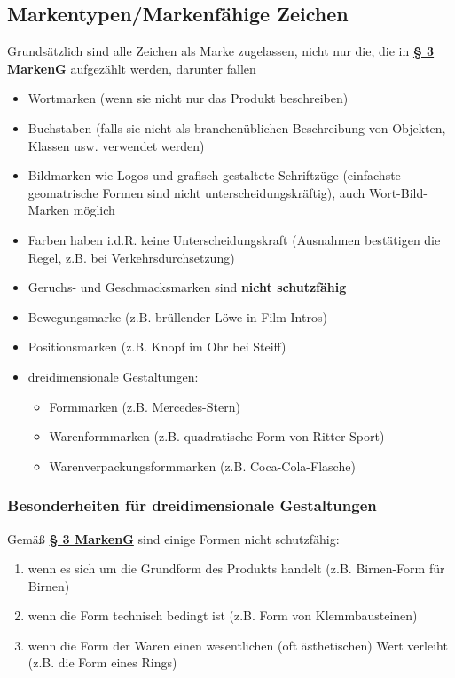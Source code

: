 \documentclass[12pt,A4]{extarticle}
\newcommand{\markenG}[2][]{\textbf{\textcolor{markenGesetzLink}{\href{https://www.gesetze-im-internet.de/markeng/__#2.html}{§ #2 \ifthenelse{\equal{#1}{}}{}{#1 }MarkenG}}}}
\begin{document}
\subsection{Markentypen/Markenfähige Zeichen}
Grundsätzlich sind alle Zeichen als Marke zugelassen, nicht nur die, die in \markenG[Abs. 1]{3} aufgezählt werden, darunter fallen
\begin{itemize}
  \item{Wortmarken (wenn sie nicht nur das Produkt beschreiben)}
  \item{Buchstaben (falls sie nicht als branchenüblichen Beschreibung von Objekten, Klassen usw. verwendet werden)}
  \item{Bildmarken wie Logos und grafisch gestaltete Schriftzüge (einfachste geomatrische Formen sind nicht unterscheidungskräftig), auch Wort-Bild-Marken möglich}
  \item{Farben haben i.d.R. keine Unterscheidungskraft (Ausnahmen bestätigen die Regel, z.B. bei Verkehrsdurchsetzung)}
  \item{Geruchs- und Geschmacksmarken sind \textbf{nicht schutzfähig}}
  \item{Bewegungsmarke (z.B. brüllender Löwe in Film-Intros)}
  \item{Positionsmarken (z.B. Knopf im Ohr bei Steiff)}
  \item{dreidimensionale Gestaltungen:
              \begin{itemize}
                \item{Formmarken (z.B. Mercedes-Stern)}
                \item{Warenformmarken (z.B. quadratische Form von Ritter Sport)}
                \item{Warenverpackungsformmarken (z.B. Coca-Cola-Flasche)}
              \end{itemize}
        }
\end{itemize}

\subsubsection{Besonderheiten für dreidimensionale Gestaltungen}
Gemäß \markenG[Abs. 2]{3} sind einige Formen nicht schutzfähig:
\begin{enumerate}
  \item{wenn es sich um die Grundform des Produkts handelt (z.B. Birnen-Form für Birnen)}
  \item{wenn die Form technisch bedingt ist (z.B. Form von Klemmbausteinen)}
  \item{wenn die Form der Waren einen wesentlichen (oft ästhetischen) Wert verleiht (z.B. die Form eines Rings)}
\end{enumerate}
\end{document}
